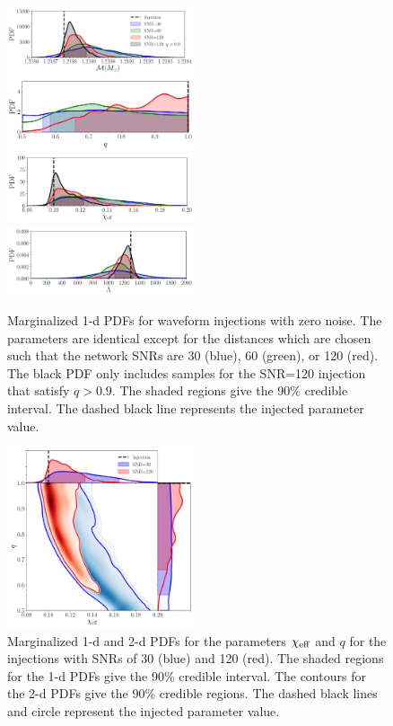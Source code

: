 \documentclass[prd,aps,letter,twocolumn,floatfix,notitlepage,nofootinbib]{revtex4-1}
\begin{document}
\begin{figure}[htb]
\centering
\includegraphics[width=0.49\textwidth]{chirpmass.pdf}\\
\includegraphics[width=0.49\textwidth]{q.pdf}\\
\includegraphics[width=0.49\textwidth]{chieff.pdf}\\
\includegraphics[width=0.49\textwidth]{tildelambda.pdf}
\caption{Marginalized 1-d PDFs for waveform injections with zero noise. The parameters are identical except for the distances which are chosen such that the network SNRs are 30 (blue), 60 (green), or 120 (red). The black PDF only includes samples for the SNR=120 injection that satisfy $q>0.9$. The shaded regions give the 90\% credible interval. The dashed black line represents the injected parameter value.}
\label{fig:1dpe}
\end{figure}

\begin{figure}[htb]
\centering
\includegraphics[width=0.49\textwidth]{chieff_q.pdf}
\caption{Marginalized 1-d and 2-d PDFs for the parameters $\chi_{\rm eff}$ and $q$ for the injections with SNRs of 30 (blue) and 120 (red). The shaded regions for the 1-d PDFs give the 90\% credible interval. The contours for the 2-d PDFs give the 90\% credible regions. The dashed black lines and circle represent the injected parameter value.}
\label{fig:2dpe}
\end{figure}
\end{document}
